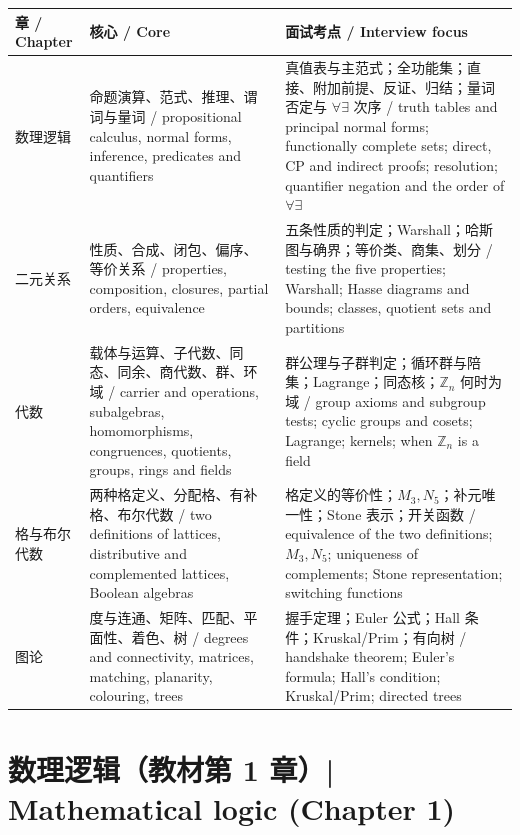 \documentclass[UTF8,11pt,a4paper]{ctexart}
\begin{document}
\begin{center}\small
\begin{tabular}{@{}>{\raggedright\arraybackslash}p{2.0cm}>{\raggedright\arraybackslash}p{5.2cm}>{\raggedright\arraybackslash}p{7.1cm}@{}}
\toprule
\textbf{章 / Chapter} & \textbf{核心 / Core} & \textbf{面试考点 / Interview focus} \\
\midrule
1 数理逻辑 & 命题演算、范式、推理、谓词与量词 / propositional calculus, normal forms, inference, predicates and quantifiers & 真值表与主范式；全功能集；直接、附加前提、反证、归结；量词否定与 $\forall\exists$ 次序 / truth tables and principal normal forms; functionally complete sets; direct, CP and indirect proofs; resolution; quantifier negation and the order of $\forall\exists$ \\
3 二元关系 & 性质、合成、闭包、偏序、等价关系 / properties, composition, closures, partial orders, equivalence & 五条性质的判定；Warshall；哈斯图与确界；等价类、商集、划分 / testing the five properties; Warshall; Hasse diagrams and bounds; classes, quotient sets and partitions \\
6 代数 & 载体与运算、子代数、同态、同余、商代数、群、环域 / carrier and operations, subalgebras, homomorphisms, congruences, quotients, groups, rings and fields & 群公理与子群判定；循环群与陪集；Lagrange；同态核；$\mathbb Z_n$ 何时为域 / group axioms and subgroup tests; cyclic groups and cosets; Lagrange; kernels; when $\mathbb Z_n$ is a field \\
7 格与布尔代数 & 两种格定义、分配格、有补格、布尔代数 / two definitions of lattices, distributive and complemented lattices, Boolean algebras & 格定义的等价性；$M_3,N_5$；补元唯一性；Stone 表示；开关函数 / equivalence of the two definitions; $M_3,N_5$; uniqueness of complements; Stone representation; switching functions \\
8 图论 & 度与连通、矩阵、匹配、平面性、着色、树 / degrees and connectivity, matrices, matching, planarity, colouring, trees & 握手定理；Euler 公式；Hall 条件；Kruskal/Prim；有向树 / handshake theorem; Euler's formula; Hall's condition; Kruskal/Prim; directed trees \\
\bottomrule
\end{tabular}
\end{center}

\section[数理逻辑（第 1 章）]{数理逻辑（教材第 1 章）| Mathematical logic (Chapter 1)}
\end{document}

